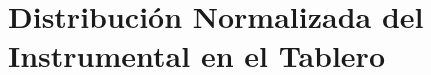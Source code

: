








  
  


\section{Distribuci\'on Normalizada del Instrumental en el Tablero}
\label{sec:U01.03.distribucion.normalizada.instrumental}


